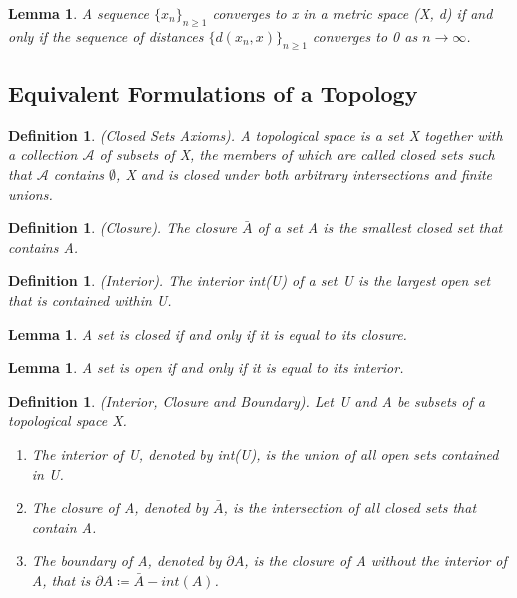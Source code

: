 \documentclass[twoside]{article}
\newtheorem{lemma}[theorem]{Lemma}
\newtheorem{definition}[theorem]{Definition}
\begin{document}
\begin{lemma}A sequence $\{x_n\}_{n \geq 1}$ converges to x in a metric space (X, d) if and only if the sequence of distances $\{d(x_n,x)\}_{n \geq 1}$ converges to 0 as $n \rightarrow \infty$.
\end{lemma}

\subsection{Equivalent Formulations of a Topology}
\begin{definition}(Closed Sets Axioms). A topological space is a set X together with a collection $\mathcal{A}$ of subsets of X, the members of which are called closed sets such that $\mathcal{A}$ contains $\emptyset$, X and is closed under both arbitrary intersections and finite unions.
\end{definition}

\begin{definition}(Closure). The closure $\bar{A}$ of a set A is the smallest closed set that contains A.
\end{definition}

\begin{definition}(Interior). The interior int(U) of a set U is the largest open set that is contained within U.
\end{definition}

\begin{lemma}A set is closed if and only if it is equal to its closure.
\end{lemma}

\begin{lemma}A set is open if and only if it is equal to its interior.
\end{lemma}

\begin{definition} (Interior, Closure and Boundary). Let U and A be subsets of a topological
space X. 
\begin{enumerate}
\item The interior of U, denoted by int(U), is the union of all open sets contained in U.
\item The closure of A, denoted by $\bar{A}$, is the intersection of all closed sets that contain A. 
\item The boundary of A, denoted by $\partial A$, is the closure of A without the interior of A, that is $\partial A \coloneqq \bar{A} - int (A)$.
\end{enumerate}
\end{definition}
\end{document}
